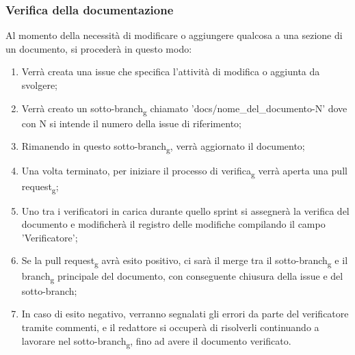\subsubsection{Verifica della documentazione} Al momento della necessità di modificare o aggiungere qualcosa a una sezione di
un documento, si procederà in questo modo:
\begin{enumerate}
      \item Verrà creata una issue che specifica l'attività di modifica o aggiunta da
            svolgere;
      \item Verrà creato un sotto-branch\textsubscript{g} chiamato
            'docs/nome\_del\_documento-N' dove con N si intende il numero della issue di
            riferimento;
      \item Rimanendo in questo sotto-branch\textsubscript{g}, verrà aggiornato il
            documento;
      \item Una volta terminato, per iniziare il processo di verifica\textsubscript{g}
            verrà aperta una pull request\textsubscript{g};
      \item Uno tra i verificatori in carica durante quello sprint si assegnerà la verifica
            del documento e modificherà il registro delle modifiche compilando il campo
            'Verificatore';
      \item Se la pull request\textsubscript{g} avrà esito positivo, ci sarà il merge tra
            il sotto-branch\textsubscript{g} e il branch\textsubscript{g} principale del
            documento, con conseguente chiusura della issue e del sotto-branch;
      \item In caso di esito negativo, verranno segnalati gli errori da parte del
            verificatore tramite commenti, e il redattore si occuperà di risolverli
            continuando a lavorare nel sotto-branch\textsubscript{g}, fino ad avere il
            documento verificato.
\end{enumerate}

